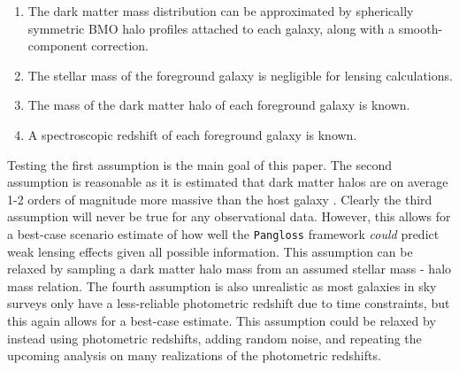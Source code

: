 \documentclass[%
 reprint,
 amsmath,amssymb,
 aps,nofootinbib
]{revtex4-1}
\begin{document}
\begin{enumerate}
\item The dark matter mass distribution can be approximated by spherically symmetric BMO halo profiles attached to each galaxy, along with a smooth-component correction.
\item The stellar mass of the foreground galaxy is negligible for lensing calculations.
\item The mass of the dark matter halo of each foreground galaxy is known.
\item A spectroscopic redshift of each foreground galaxy is known.
\end{enumerate}

Testing the first assumption is the main goal of this paper. The second assumption is reasonable as it is estimated that dark matter halos are on average 1-2 orders of magnitude more massive than the host galaxy \cite{smhr}. Clearly the third assumption will never be true for any observational data. However, this allows for a best-case scenario estimate of how well the \texttt{Pangloss} framework \textit{could} predict weak lensing effects given all possible information. This assumption can be relaxed by sampling a dark matter halo mass from an assumed stellar mass - halo mass relation. The fourth assumption is also unrealistic as most galaxies in sky surveys only have a less-reliable photometric redshift due to time constraints, but this again allows for a best-case estimate. This assumption could be relaxed by instead using photometric redshifts, adding random noise, and repeating the upcoming analysis on many realizations of the photometric redshifts.


\end{document}
